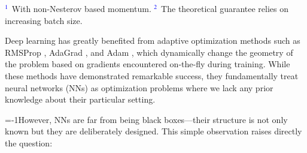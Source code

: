 
\begin{table*}[t]
\caption{Special instantiations of \ref{eq:uSCG} according to different choices of norm. 
The reduced SVD is given as $s=U\diag(\sigma) V^\top$.
Weight decay is captured by \ref{eq:SCG}, which provides explicit control on the norm of the parameters.
}
\label{tbl:lmo}
\bgroup
\def\arraystretch{1.2}
\egroup
\footnotesize 
$\blue{^1}$ With non-Nesterov based momentum. 
$\blue{^2}$ The theoretical guarantee relies on increasing batch size. \\
\end{table*}




Deep learning has greatly benefited from adaptive optimization methods such as RMSProp \citep{hinton2012neural}, AdaGrad \citep{JMLR:v12:duchi11a,mcmahan2010}, and Adam \citep{kingma2014adam}, which dynamically change the geometry of the problem based on gradients encountered on-the-fly during training. 
While these methods have demonstrated remarkable success, they fundamentally treat neural networks (NNs) as optimization problems where we lack any prior knowledge about their particular setting. 

\looseness=-1However, NNs are far from being
 black boxes—their structure is not only known but they are deliberately designed. 
This simple observation raises directly the question: 

